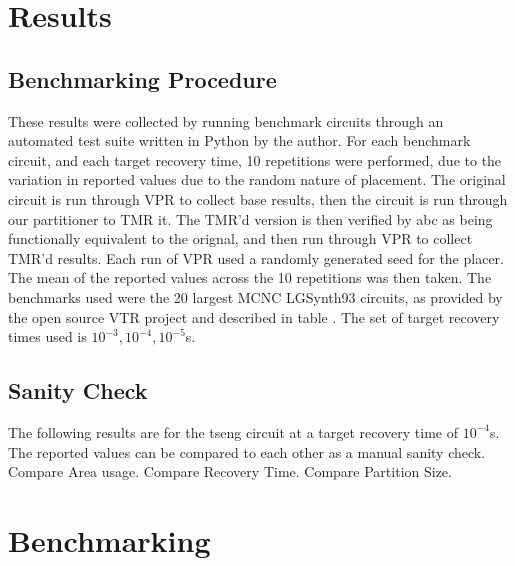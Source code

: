 \documentclass[12pt,final,oneside]{dwThesis} %
\begin{document}
\chapter{Results}
\section{Benchmarking Procedure}
These results were collected by running benchmark circuits through an automated test suite written in Python by the author. For each benchmark circuit, and each target recovery time, 10 repetitions were performed, due to the variation in reported values due to the random nature of placement.
The original circuit is run through VPR to collect base results, then the circuit is run through our partitioner to TMR it. The TMR'd version is then verified by abc as being functionally equivalent to the orignal, and then run through VPR to collect TMR'd results. Each run of VPR used a randomly generated seed for the placer.
The mean of the reported values across the 10 repetitions was then taken.
The benchmarks used were the 20 largest MCNC LGSynth93 circuits, as provided by the open source VTR project  and described in table .
The set of target recovery times used is $10^{-3}, 10^{-4}, 10^{-5}$s.

\section{Sanity Check}
The following results are for the tseng circuit at a target recovery time of $10^{-4}$s. The reported values can be compared to each other as a manual sanity check.
Compare Area usage.
Compare Recovery Time.
Compare Partition Size.



\chapter{Benchmarking}
\end{document}
